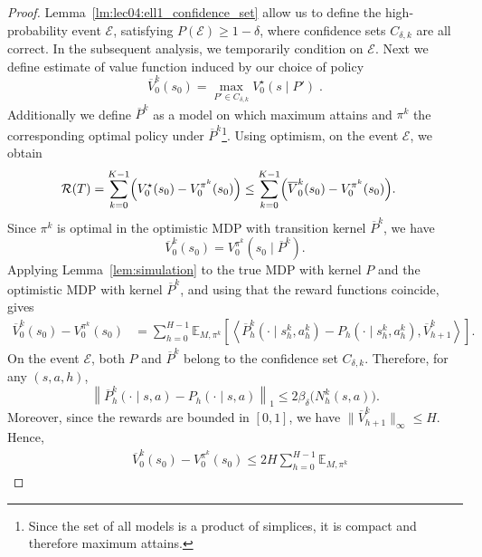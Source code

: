 \documentclass{article}
\numberwithin{equation}{section}
\newcommand{\eqsp}{\;}
\begin{document}
\begin{proof}
     Lemma~\ref{lm:lec04:ell1_confidence_set} allow us to define the high-probability event \( \mathcal{E} \), satisfying \( P(\mathcal{E}) \geq 1 -\delta\), where confidence sets $C_{\delta,k}$ are all correct. In the subsequent analysis, we temporarily condition on \(\mathcal{E}\). Next we define estimate of value function induced by our choice of policy
    \begin{equation}\label{eq:ucrl_optimism}
        \overline{V}^k_0(s_0) = \max_{P' \in C_{\delta, k}} V^\star_0(s \mid P')\eqsp.
    \end{equation}
    Additionally we define $\overline{P}^k$ as a model on which maximum attains and \(\pi^k\) the corresponding optimal policy under \(\overline{P}^k\)\footnote{Since the set of all models is a product of simplices, it is compact and therefore maximum attains.}. {Using optimism, on the event \(\mathcal E\), we obtain
\begin{align*}
    \mathcal R(T)
    &=
    \sum_{k=0}^{K-1}
    \Bigl(
        V_0^\star(s_0)-V_0^{\pi^k}(s_0)
    \Bigr)  \leq
    \sum_{k=0}^{K-1}
    \Bigl(
        \overline V_0^k(s_0)-V_0^{\pi^k}(s_0)
    \Bigr).
\end{align*}
Since \(\pi^k\) is optimal in the optimistic MDP with transition kernel
\(\overline P^k\), we have
\[
    \overline V_0^k(s_0)
    =
    V_0^{\pi^k}(s_0 \mid \overline P^k).
\]
Applying Lemma~\ref{lem:simulation} to the true MDP with kernel \(P\)
and the optimistic MDP with kernel \(\overline P^k\), and using that the
reward functions coincide, gives
\begin{align*}
    \overline V_0^k(s_0)-V_0^{\pi^k}(s_0)
    &=
    \sum_{h=0}^{H-1}
    \mathbb E_{M,\pi^k}
    \left[
        \left\langle
            \overline P_h^k(\cdot\mid s_h^k,a_h^k)
            -
            P_h(\cdot\mid s_h^k,a_h^k),
            \overline V_{h+1}^k
        \right\rangle
    \right].
\end{align*}
On the event \(\mathcal E\), both \(P\) and \(\overline P^k\) belong to
the confidence set \(C_{\delta,k}\). Therefore, for any \((s,a,h)\),
\[
    \left\|
        \overline P_h^k(\cdot\mid s,a)
        -
        P_h(\cdot\mid s,a)
    \right\|_1
    \leq
    2\beta_\delta\bigl(N_h^k(s,a)\bigr).
\]
Moreover, since the rewards are bounded in \([0,1]\), we have
\(\|\overline V_{h+1}^k\|_\infty \leq H\). Hence,
\begin{align*}
    &\overline V_0^k(s_0)-V_0^{\pi^k}(s_0)
    \leq
    2H
    \sum_{h=0}^{H-1}
    \mathbb E_{M,\pi^k}

\end{align*}}
\end{proof}
\end{document}
